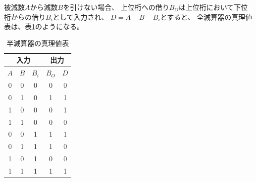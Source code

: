 \documentclass[12pt]{jarticle}
\begin{document}
\begin{itemize}
          被減数$A$から減数$B$を引けない場合、
          上位桁への借り$B_O$は上位桁において下位桁からの借り$B_i$として入力され、
          $D = A - B - B_i$とすると、
          全減算器の真理値表は、表\ref{repotbl5}のようになる。
          \begin{table}[h]
              \caption{半減算器の真理値表}
              \begin{center}
                  \begin{tabular}{|ccc|cc|}
                      \hline
                      \multicolumn{3}{|c|}{入力} & \multicolumn{2}{|c|}{出力}                       \\
                      \hline
                      $A$                        & $B$                        & $B_i$ & $B_O$ & $D$ \\
                      \hline
                      0                          & 0                          & 0     & 0     & 0   \\
                      0                          & 1                          & 0     & 1     & 1   \\
                      1                          & 0                          & 0     & 0     & 1   \\
                      1                          & 1                          & 0     & 0     & 0   \\
                      0                          & 0                          & 1     & 1     & 1   \\
                      0                          & 1                          & 1     & 1     & 0   \\
                      1                          & 0                          & 1     & 0     & 0   \\
                      1                          & 1                          & 1     & 1     & 1   \\
                      \hline
                  \end{tabular}
              \end{center}
              \label{repotbl5}
          \end{table}


\end{itemize}
\end{document}
